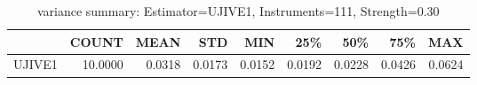 \begin{table}[ht]
\centering
\caption{variance summary: Estimator=UJIVE1, Instruments=111, Strength=0.30}
\begin{tabular}{lrrrrrrrr}
\toprule
 & COUNT & MEAN & STD & MIN & 25\% & 50\% & 75\% & MAX \\
\midrule
UJIVE1 & 10.0000 & 0.0318 & 0.0173 & 0.0152 & 0.0192 & 0.0228 & 0.0426 & 0.0624 \\
\bottomrule
\end{tabular}
\end{table}
